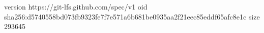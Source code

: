 version https://git-lfs.github.com/spec/v1
oid sha256:d5740558bd073fb9323fe7f7e571a6b681be0935aa2f21eec85eddf65afc8e1c
size 293645
